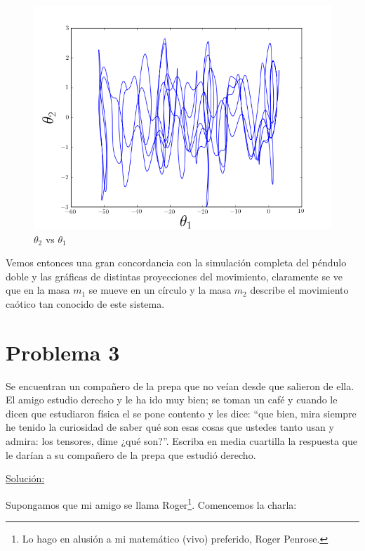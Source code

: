 \documentclass[a4paper,10pt]{article}
\numberwithin{equation}{section}
\begin{document}
\begin{figure}[H]
\center
\includegraphics[scale=0.5]{problema2fig6}
\caption{$\theta_2$ vs $\theta_1$}
\label{fig:problema2fig6}
\end{figure}

Vemos entonces una gran concordancia con la simulación completa del péndulo doble y las 
gráficas de distintas proyecciones del movimiento, claramente se ve que en la masa 
$m_1$ se mueve en un círculo y la masa $m_2$ describe el movimiento caótico
tan conocido de este sistema.

\section{Problema 3}

Se encuentran un compañero de la prepa que no veían desde que salieron de ella. El 
amigo estudio derecho y le ha ido muy bien; se toman un café y cuando le dicen que 
estudiaron física el se pone contento y les dice: ``que bien, mira siempre he tenido
la curiosidad de saber qué son esas cosas que ustedes tanto usan y admira: los 
tensores, dime ¿qué son?''. Escriba en media cuartilla la respuesta que le darían 
a su compañero de la prepa que estudió derecho.

\vspace{.3cm}

\underline{Solución:} \vspace{.3cm}

Supongamos que mi amigo se llama Roger\footnote{Lo hago en alusión a mi matemático (vivo)
preferido, Roger Penrose.}. Comencemos la charla:
\end{document}
